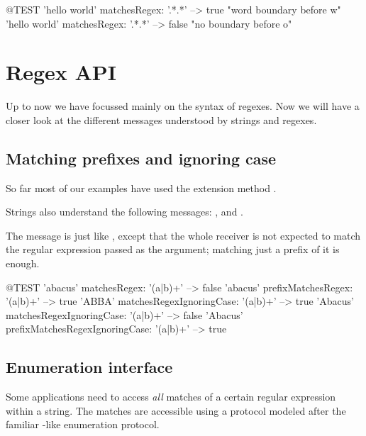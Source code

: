 \documentclass[a4paper,10pt,twoside]{book}
\begin{document}
{\begin{code}{@TEST}
'hello world' matchesRegex: '.*\bw.*' --> true      "word boundary before w"
'hello world' matchesRegex: '.*\bo.*'  --> false    "no boundary before o"
\end{code}

\section{Regex API}

Up to now we have focussed mainly on the syntax of regexes.  Now we will have a closer look at the different messages understood by strings and regexes.

\subsection{Matching prefixes and ignoring case}

So far most of our examples have used the  extension method .

Strings also understand the following messages:
,  and
.

The message  is just like , except that the whole receiver is not expected to match the regular expression passed as the argument; matching just a prefix of it is enough.
\begin{code}{@TEST}
'abacus' matchesRegex: '(a|b)+'                                --> false
'abacus' prefixMatchesRegex: '(a|b)+'                       --> true
'ABBA' matchesRegexIgnoringCase: '(a|b)+'            --> true
'Abacus' matchesRegexIgnoringCase: '(a|b)+'          --> false
'Abacus' prefixMatchesRegexIgnoringCase: '(a|b)+' --> true
\end{code}

\subsection{Enumeration interface}

Some applications need to access \emph{all} matches of a certain regular expression within a string.  The matches are accessible using a protocol modeled after the familiar -like enumeration protocol.

}
\end{document}
